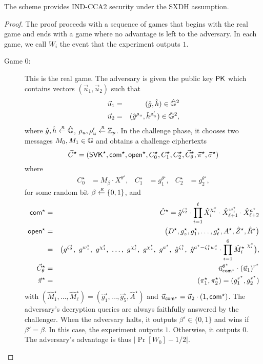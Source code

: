 \begin{myTh}
The scheme provides IND-CCA2 security under the SXDH assumption.
\end{myTh}
\begin{proof}
The proof proceeds with a sequence of games that begins with the real game and ends with a game where no advantage is left to the adversary. In each game, we call $W_i$ the event that the experiment outputs $1$. 

\begin{description}
\item[\textsf{Game} $0$:] This is the real game. The adversary is given the public key $\mathsf{PK}$ which contains 
vectors 
 $(\vec{u}_1, \vec{u}_2)$ such that
\begin{eqnarray} \label{vec-PK} 
 \vec{u}_1 &=& (\hat{g}, \hat{h}) \in \hat{\mathbb{G}}^2  \\ \nonumber 
 \vec{u}_2 &=&  (\hat{g}^{\rho_u}, \hat{h}^{\rho_u'}) \in \hat{\mathbb{G}}^2,
\end{eqnarray}
where $\hat{g},\hat{h} \stackrel{{\scriptscriptstyle \mkern4mu R}}{\gets} \hat{\mathbb{G}}$,  $\rho_u,\rho_u' \stackrel{{\scriptscriptstyle \mkern4mu R}}{\gets} \mathbb{Z}_p$.
 In the challenge phase, 
it chooses two messages $M_0,M_1 \in \mathbb{G}$ and obtains a challenge ciphertexts 
$$  \vec{C}^\star = (\mathsf{SVK}^\star, \mathsf{com}^\star, \mathsf{open}^\star, C_0^\star, C_1^\star, C_2^\star, \vec{C}_{\theta}^\star, \vec{\pi}^\star, \vec{\sigma}^\star)  $$
where 
   \begin{align*}
          C_0^\star &= M_{\beta} \cdot X^{\theta^\star}, & C_1^\star &= g_1^{\theta^\star}, & C_2^\star &= g_2^{\theta^\star},
        \end{align*}
for some random bit $\beta \stackrel{{\scriptscriptstyle \mkern4mu R}}{\gets} \{0,1\}$, and 
\begin{eqnarray*}
 \mathsf{com}^\star  &=& \hat{C}^\star  = \hat{g}^{\zeta_2^\star} \cdot \prod_{i = 1}^{\ell }\hat{X}_i^{\chi_i^\star } \cdot \hat{X}_{\ell+1}^{w_z^\star} \cdot \hat{X}_{\ell+2}^{a^\star}  \\
 \mathsf{open}^\star &=& \big( D^\star , g_z^\star, g_1^\star, \dots, g_\ell^\star, A^\star  , \hat{Z}^\star, \hat{R}^\star \big)  \\ 
& =& \big(  g^{\zeta_2^\star },~ g^{w_z^\star}, ~ g^{\chi_1^\star}, ~\ldots , ~ g^{\chi_\ell^\star} , ~ g^{\chi_z^\star} , ~ g^{a^\star}, ~ 		 
			 \hat{g}^{\zeta_1^\star} ,  ~\hat{g}^{a^\star-\zeta_1^\star w_z^\star }  \cdot  \prod_{i=1}^{6} {\hat{M}_i^\star~ }^{\chi_i^\star} 
		 \big), \\
\vec{C}_{\theta}^\star &=& \vec{u}_{\mathsf{com}^\star}^{\theta^\star} \cdot (\vec{u}_1)^{r^\star}\\
 \vec{\pi}^\star &=& (\pi_1^\star,\pi_2^\star) =(g_1^{r^\star},g_2^{r^\star}) 
\end{eqnarray*}
with $(\hat{M}_1^\star,\ldots,\hat{M}_\ell^\star)=(\hat{g}_1^\star,\ldots,\hat{g}_5^\star,\hat{A}^\star) $ and 
$\vec{u}_{\mathsf{com}^\star} = \vec{u}_2\cdot (1, \mathsf{com}^\star)$.
\indent The adversary's decryption queries are always faithfully answered by the challenger. When the adversary halts, it outputs   
$\beta' \in \{0,1\}$ and wins if $\beta' =\beta$. In this case, the experiment outputs $1$. Otherwise, it outputs $0$.  
The adversary's advantage is thus $|\Pr[W_0]-1/2|$. \smallskip \smallskip 


\end{description}
\end{proof}
